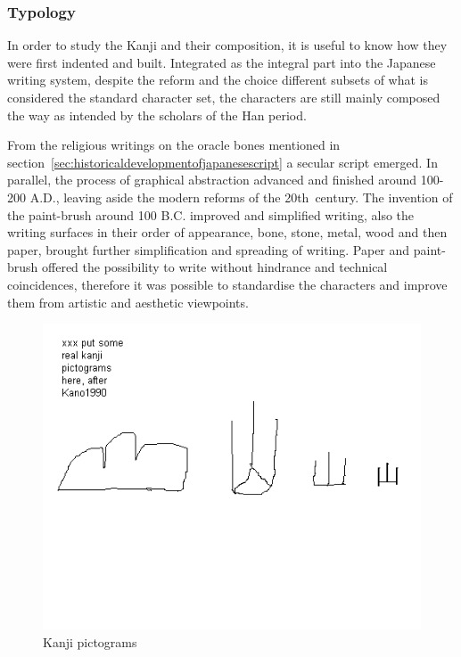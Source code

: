 \subsubsection{Typology}
\label{sec:typologyofthekanji}

In order to study the Kanji and their composition, it is useful to know how they
were first indented and built. Integrated as the integral part into the Japanese
writing system, despite the reform and the choice different subsets of what is 
considered the standard character set, the characters are still mainly composed
the way as intended by the scholars of the Han period.

From the religious writings on the oracle bones mentioned in 
section~\ref{sec:historicaldevelopmentofjapanesescript} a secular script 
emerged. In parallel, the process of graphical abstraction advanced and
finished around 100-200 A.D., leaving aside the modern reforms of the 
20th~century. The invention of the paint-brush around 100 B.C. improved and 
simplified writing, also the writing surfaces in their order of appearance,
bone, stone, metal, wood and then paper, brought further simplification and
spreading of writing. Paper and paint-brush offered the possibility to write
without hindrance and technical coincidences, therefore it was possible to
standardise the characters and improve them from artistic and aesthetic 
viewpoints.

\begin{figure}[htbp]
\includegraphics[scale=0.5]{images/kanjipictograms.png}
\caption{Kanji pictograms}
\label{fig:kanjipictograms}
\end{figure}

